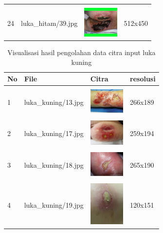 \begin{table}[H]
\begin{tabular}{|m{0.2in}|m{1.2in}|m{0.7in}|m{0.7in}|}
		& &  &  \\
		24 & 
		luka\_hitam/39.jpg &
		\includegraphics[width=0.7in]{gambar/dataset_citra/luka_hitam/39.jpg}&
		512x450\\
		\hline

	\end{tabular}
\end{table}

\begin{table}[H]
	\centering
	\caption{Visualisasi hasil pengolahan data citra input luka kuning}
	\label{tabel_input_5}
	\begin{tabular}{|m{0.2in}|m{1.2in}|m{0.7in}|m{0.7in}|}
		\hline
		\textbf{No} & \textbf{File} & \textbf{Citra} & \textbf{resolusi} \\
		\hline
		
		& &  &  \\
		1 & 
		luka\_kuning/13.jpg &
		\includegraphics[width=0.7in]{gambar/dataset_citra/luka_kuning/13.jpg}&
		266x189\\
		\hline
		
		& &  &  \\
		2& 
		luka\_kuning/17.jpg &
		\includegraphics[width=0.7in]{gambar/dataset_citra/luka_kuning/17.jpg}&
		259x194\\
		\hline
		
		& &  &  \\
		3& 
		luka\_kuning/18.jpg &
		\includegraphics[width=0.7in]{gambar/dataset_citra/luka_kuning/18.jpg}&
		265x190\\
		\hline
		
		& &  &  \\
		4& 
		luka\_kuning/19.jpg &
		\includegraphics[width=0.7in]{gambar/dataset_citra/luka_kuning/19.jpg}&
		120x151\\
		\hline
		

\end{tabular}
\end{table}
